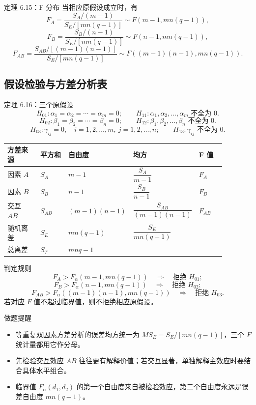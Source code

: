 \documentclass[UTF8,zihao=-4,fontset=fandol]{ctexart}
\begin{document}
\begin{keybox}{定理 6.15：F 分布}
当相应原假设成立时，有
\[
F_A
=\frac{S_A/(m-1)}{S_E/[mn(q-1)]}
\sim F(m-1,mn(q-1)),
\]
\[
F_B
=\frac{S_B/(n-1)}{S_E/[mn(q-1)]}
\sim F(n-1,mn(q-1)),
\]
\[
F_{AB}
=\frac{S_{AB}/[(m-1)(n-1)]}{S_E/[mn(q-1)]}
\sim F((m-1)(n-1),mn(q-1)).
\]
\end{keybox}

\subsection{假设检验与方差分析表}

\begin{keybox}{定理 6.16：三个原假设}
\[
H_{01}:\alpha_1=\alpha_2=\cdots=\alpha_m=0;
\qquad
H_{11}:\alpha_1,\alpha_2,\ldots,\alpha_m\text{ 不全为 }0.
\]
\[
H_{02}:\beta_1=\beta_2=\cdots=\beta_n=0;
\qquad
H_{12}:\beta_1,\beta_2,\ldots,\beta_n\text{ 不全为 }0.
\]
\[
H_{03}:\gamma_{ij}=0,\quad i=1,2,\ldots,m,\ j=1,2,\ldots,n;
\qquad
H_{13}:\gamma_{ij}\text{ 不全为 }0.
\]
\end{keybox}

\begin{longtable}{@{}p{0.17\linewidth}p{0.14\linewidth}p{0.2\linewidth}p{0.24\linewidth}p{0.13\linewidth}@{}}
\toprule
\textbf{方差来源} & \textbf{平方和} & \textbf{自由度} & \textbf{均方} & \textbf{F 值} \\
\midrule
因素 $A$ & $S_A$ & $m-1$ & $\dfrac{S_A}{m-1}$ & $F_A$ \\
因素 $B$ & $S_B$ & $n-1$ & $\dfrac{S_B}{n-1}$ & $F_B$ \\
交互 $AB$ & $S_{AB}$ & $(m-1)(n-1)$ & $\dfrac{S_{AB}}{(m-1)(n-1)}$ & $F_{AB}$ \\
随机离差 & $S_E$ & $mn(q-1)$ & $\dfrac{S_E}{mn(q-1)}$ & \\
总离差 & $S_T$ & $mnq-1$ & & \\
\bottomrule
\end{longtable}

\begin{methodbox}{判定规则}
\[
F_A>F_{\alpha}(m-1,mn(q-1))
\quad\Rightarrow\quad
\text{拒绝 }H_{01};
\]
\[
F_B>F_{\alpha}(n-1,mn(q-1))
\quad\Rightarrow\quad
\text{拒绝 }H_{02};
\]
\[
F_{AB}>F_{\alpha}((m-1)(n-1),mn(q-1))
\quad\Rightarrow\quad
\text{拒绝 }H_{03}.
\]
若对应 $F$ 值不超过临界值，则不拒绝相应原假设。
\end{methodbox}

\begin{warnbox}{做题提醒}
\begin{itemize}
  \item 等重复双因素方差分析的误差均方统一为 $MS_E=S_E/[mn(q-1)]$，三个 $F$ 统计量都用它作分母。
  \item 先检验交互效应 $AB$ 往往更有解释价值；若交互显著，单独解释主效应时要结合具体水平组合。
  \item 临界值 $F_{\alpha}(d_1,d_2)$ 的第一个自由度来自被检验效应，第二个自由度永远是误差自由度 $mn(q-1)$。
\end{itemize}
\end{warnbox}
\end{document}

